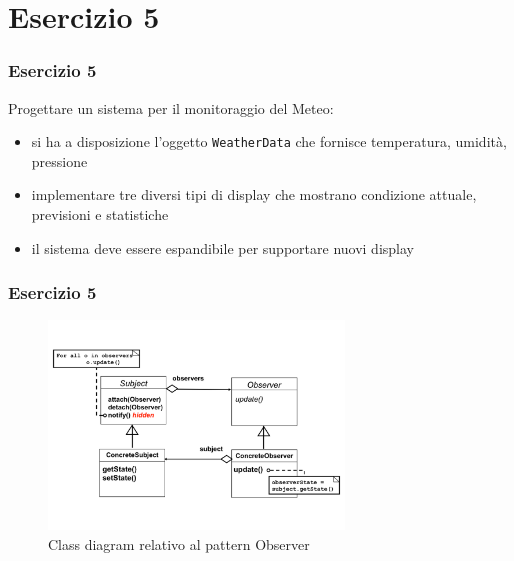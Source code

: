 \documentclass{beamer}
\begin{document}
\section{Esercizio 5}
\begin{frame}
\frametitle{Esercizio 5}
Progettare un sistema per il monitoraggio del Meteo:
\begin{itemize}
\item si ha a disposizione l'oggetto \texttt{WeatherData} che fornisce temperatura, umidit\`a, pressione
\item implementare tre diversi tipi di display che mostrano condizione attuale, previsioni e statistiche
\item il sistema deve essere espandibile per supportare nuovi display
\end{itemize}
\end{frame}

\begin{frame}
\frametitle{Esercizio 5}
\begin{figure}[h]
\centering
\includegraphics[width=0.7\textwidth]{Img/Observer.pdf}
\caption{Class diagram relativo al pattern Observer}
\label{Fig:ObserverConcepts}
\end{figure}
\end{frame}
\end{document}
